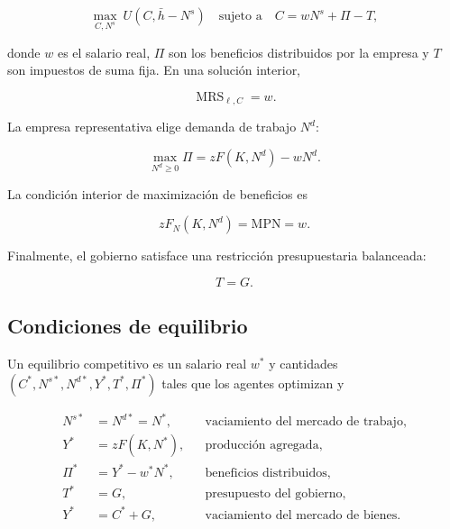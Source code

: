 \documentclass[12pt]{article}
\theoremstyle{cideplain}
\theoremstyle{cidedef}
\DeclareMathOperator{\MRS}{MRS}
\begin{document}
\begin{equation}
  \max_{C,N^s}\ U(C,\bar h-N^s)
  \quad\text{sujeto a}\quad
  C=wN^s+\Pi-T,
  \label{eq:williamson-consumer}
\end{equation}

donde \(w\) es el salario real, \(\Pi\) son los beneficios distribuidos por la empresa y
\(T\) son impuestos de suma fija. En una solución interior,

\begin{equation}
  \MRS_{\ell,C}=w.
  \label{eq:williamson-consumer-foc}
\end{equation}

La empresa representativa elige demanda de trabajo \(N^d\):

\begin{equation}
  \max_{N^d\geq0}
  \Pi=zF(K,N^d)-wN^d.
  \label{eq:williamson-firm}
\end{equation}

La condición interior de maximización de beneficios es

\begin{equation}
  zF_N(K,N^d)=\mathrm{MPN}=w.
  \label{eq:williamson-firm-foc}
\end{equation}

Finalmente, el gobierno satisface una restricción presupuestaria balanceada:

\begin{equation}
  T=G.
  \label{eq:government-budget}
\end{equation}

\subsection{Condiciones de equilibrio}

Un equilibrio competitivo es un salario real \(w^*\) y cantidades
\((C^*,N^{s*},N^{d*},Y^*,T^*,\Pi^*)\) tales que los agentes optimizan y

\begin{align}
  N^{s*}&=N^{d*}=N^*,
  &&\text{vaciamiento del mercado de trabajo},
  \label{eq:labor-clearing}\\
  Y^*&=zF(K,N^*),
  &&\text{producción agregada},
  \label{eq:output}\\
  \Pi^*&=Y^*-w^*N^*,
  &&\text{beneficios distribuidos},
  \label{eq:profits}\\
  T^*&=G,
  &&\text{presupuesto del gobierno},
  \label{eq:government}\\
  Y^*&=C^*+G,
  &&\text{vaciamiento del mercado de bienes}.
  \label{eq:goods-clearing}
\end{align}
\end{document}
